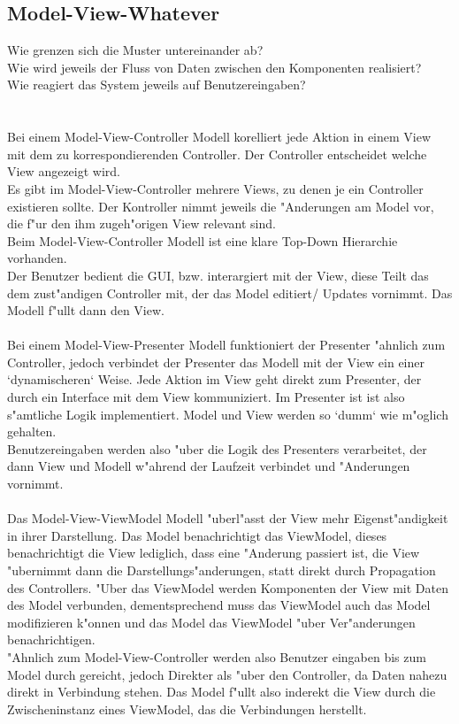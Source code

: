 \documentclass{article}
\newcommand{\gap}{\ \\ \\}
\begin{document}
\subsection{Model-View-Whatever}
Wie grenzen sich die Muster untereinander ab?\\
Wie wird jeweils der Fluss von Daten zwischen den Komponenten realisiert?\\
Wie reagiert das System jeweils auf Benutzereingaben?\\
\gap
Bei einem Model-View-Controller Modell korelliert jede Aktion in einem View mit dem
    zu korrespondierenden Controller. Der Controller entscheidet welche View
    angezeigt wird.\\
Es gibt im Model-View-Controller mehrere Views, zu denen je ein Controller 
    existieren sollte. Der Kontroller nimmt jeweils die "Anderungen am Model vor,
    die f"ur den ihm zugeh"origen View relevant sind.\\
Beim Model-View-Controller Modell ist eine klare Top-Down Hierarchie vorhanden.\\
Der Benutzer bedient die GUI, bzw. interargiert mit der View, diese Teilt das
    dem zust"andigen Controller mit, der das Model editiert/ Updates vornimmt.
    Das Modell f"ullt dann den View.\\
\\
Bei einem Model-View-Presenter Modell funktioniert der Presenter "ahnlich zum
    Controller, jedoch verbindet der Presenter das Modell mit der View ein einer
    `dynamischeren` Weise. Jede Aktion im View geht direkt zum Presenter, der
    durch ein Interface mit dem View kommuniziert. Im Presenter ist ist also 
    s"amtliche Logik implementiert. Model und View werden so `dumm` wie 
    m"oglich gehalten.\\
Benutzereingaben werden also "uber die Logik des Presenters verarbeitet, der dann
    View und Modell w"ahrend der Laufzeit verbindet und "Anderungen vornimmt.\\
\\
Das Model-View-ViewModel Modell "uberl"asst der View mehr Eigenst"andigkeit in 
    ihrer Darstellung. Das Model benachrichtigt das ViewModel, dieses
    benachrichtigt die View lediglich, dass
    eine "Anderung passiert ist, die View "ubernimmt dann die 
    Darstellungs"anderungen, statt direkt durch Propagation des Controllers. 
    "Uber das ViewModel werden Komponenten der View 
    mit Daten des Model verbunden, dementsprechend muss das ViewModel auch 
    das Model modifizieren k"onnen und das Model das ViewModel "uber Ver"anderungen
    benachrichtigen.\\
"Ahnlich zum Model-View-Controller werden also Benutzer eingaben bis zum Model
    durch gereicht, jedoch Direkter als "uber den Controller, da Daten nahezu
    direkt in Verbindung stehen. Das Model f"ullt also inderekt die View durch
    die Zwischeninstanz eines ViewModel, das die Verbindungen herstellt.\\
\end{document}

